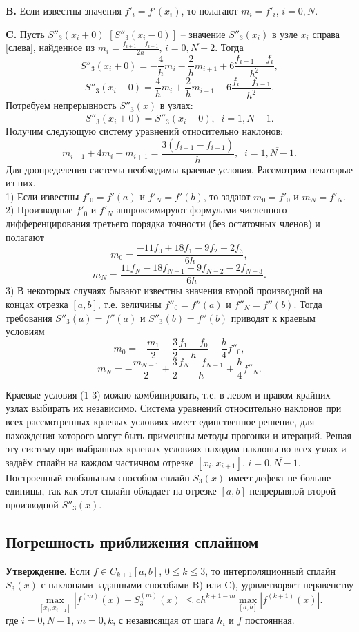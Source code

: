 \documentclass[
11pt,
master, %
subf, %
href, %
colorlinks=true, %
times, %
]{disser}
\begin{document}
\textbf{B.} Если известны значения $f'_i=f'(x_i)$, то полагают $m_i=f'_i$, $i=\overline{0,N}$.

\textbf{C.} Пусть $S''_3(x_i+0)$ $[S''_3(x_i-0)]$ -- значение $S''_3(x_i)$ в узле $x_i$ справа [слева], найденное из $m_i=\frac{f_{i+1}-f_{i-1}}{2h}$, $i=\overline{0,N-2}.$ Тогда
      $$S''_3(x_i+0)=-\frac{4}{h}m_i-\frac{2}{h}m_{i+1}+6\frac{f_{i+1}-f_i}{h^2},$$
      $$S''_3(x_i-0)=\frac{4}{h}m_i+\frac{2}{h}m_{i-1}-6\frac{f_i-f_{i-1}}{h^2}.$$
Потребуем непрерывность $S''_3(x)$ в узлах:
$$S''_3(x_i+0)=S''_3(x_i-0),\;\;i=\overline{1,N-1}.$$
Получим следующую систему уравнений относительно наклонов:
$$m_{i-1}+4m_i+m_{i+1}=\frac{3(f_{i+1}-f_{i-1})}{h},\;\;i=\overline{1,N-1}.$$
Для доопределения системы необходимы краевые условия. Рассмотрим некоторые из них.\\
1) Если известны $f'_0=f'(a)$ и $f'_N=f'(b)$, то задают $m_0=f'_0$ и $m_N=f'_N$.\\
2) Производные $f'_0$  и $f'_N$ аппроксимируют формулами численного дифференцирования третьего порядка точности (без остаточных членов) и полагают
$$m_0=\frac{-11f_0+18f_1-9f_2+2f_3}{6h},$$
$$m_N=\frac{11f_N-18f_{N-1}+9f_{N-2}-2f_{N-3}}{6h}.$$
3) В некоторых случаях бывают известны значения второй производной на концах отрезка $[a,b]$, т.е. величины $f''_0=f''(a)$ и $f''_N=f''(b)$. Тогда требования $S''_3(a)=f''(a)$ и $S''_3(b)=f''(b)$ приводят к краевым условиям $$m_0=-\frac{m_1}{2}+\frac{3}{2}\frac{f_1-f_0}{h}-\frac{h}{4}f''_0,$$ $$m_N=-\frac{m_{N-1}}{2}+\frac{3}{2}\frac{f_N-f_{N-1}}{h}+\frac{h}{4}f''_N.$$

Краевые условия (1-3) можно комбинировать, т.е. в левом и правом крайних узлах выбирать их независимо.
Система уравнений относительно наклонов при всех рассмотренных краевых условиях имеет единственное решение, для нахождения которого могут быть применены методы прогонки и итераций. Решая эту систему при выбранных краевых условиях находим наклоны во всех узлах и задаём сплайн на каждом частичном отрезке $[x_i,x_{i+1}]$, $i=\overline{0,N-1}$. Построенный глобальным способом сплайн $S_3(x)$ имеет дефект не больше единицы, так как этот сплайн обладает на отрезке $[a,b]$ непрерывной второй производной $S''_3(x)$.

\subsection{Погрешность приближения сплайном}
\textbf{Утверждение}. Если $f\in C_{k+1}[a,b]$, $0\leq k\leq 3$, то интерполяционный сплайн $S_3(x)$ с наклонами заданными способами B) или C), удовлетворяет неравенству
\begin{equation}\label{eq1110}
  \max_{[x_i,x_{i+1}]}|f^{(m)}(x)-S^{(m)}_3(x)|\leq ch^{k+1-m}\max_{[a,b]}|f^{(k+1)}(x)|.
\end{equation}
где $i=\overline{0,N-1}$, $m=\overline{0,k}$, с независящая от шага $h_i$ и $f$ постоянная.
\end{document}
